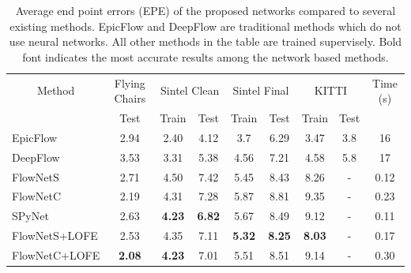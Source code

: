 \documentclass[10pt,twocolumn,letterpaper]{article}
\begin{document}
\begin{table}[]
\centering
\caption{Average end point errors (EPE) of the proposed networks compared to several existing methods. EpicFlow and DeepFlow are traditional methods which do not use neural networks. All other methods in the table are trained supervisely. Bold font indicates the most accurate results among the network based methods.}
\label{tab: results supervised}
\begin{tabular}{lcccccccc}
\hline
\hline
\multicolumn{1}{c}{Method} & Flying Chairs & \multicolumn{2}{c}{Sintel Clean} & \multicolumn{2}{c}{Sintel Final} & \multicolumn{2}{c}{KITTI} & Time (s) \\
                           & Test          & Train           & Test           & Train           & Test           & Train            & Test   &          \\ \hline
EpicFlow                   & 2.94          & 2.40            & 4.12           & 3.7             & 6.29           & 3.47             & 3.8    & 16       \\
DeepFlow                   & 3.53          & 3.31            & 5.38           & 4.56            & 7.21           & 4.58             & 5.8    & 17       \\ \hline
FlowNetS                   & 2.71          & 4.50            & 7.42           & 5.45            & 8.43           & 8.26             & -      & 0.12     \\
FlowNetC                   & 2.19          & 4.31            & 7.28           & 5.87            & 8.81           & 9.35             & -      & 0.23     \\
SPyNet                     & 2.63          & \textbf{4.23}   & \textbf{6.82}           & 5.67            & 8.49           & 9.12             & -      & 0.11     \\
FlowNetS+LOFE              & 2.53          & 4.35            & 7.11           & \textbf{5.32}   & \textbf{8.25}  & \textbf{8.03}    & -      & 0.17     \\
FlowNetC+LOFE              & \textbf{2.08} & \textbf{4.23}            & 7.01  & 5.51            & 8.51           & 9.14             & -      & 0.30     \\ \hline
\end{tabular}
\end{table}
\end{document}
